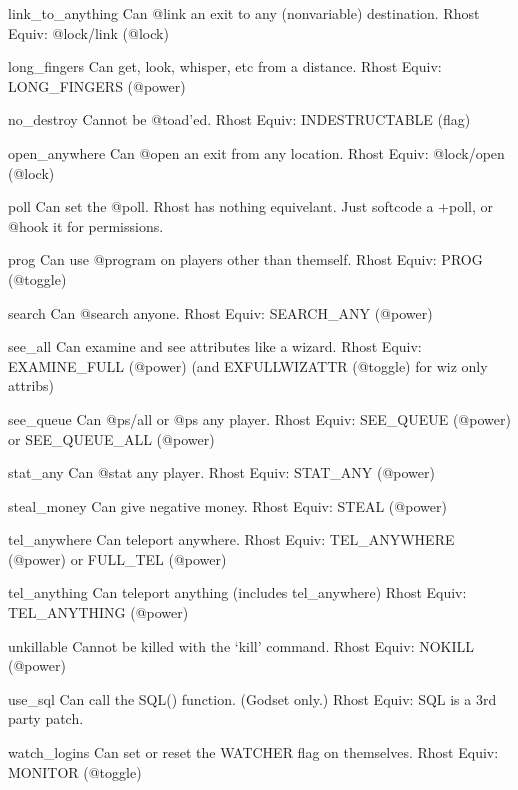 \documentclass[letterpaper,10pt,english]{sphinxmanual}
\begin{document}
\sphinxAtStartPar
link\_to\_anything      Can @link an exit to any (non\sphinxhyphen{}variable) destination.
Rhost Equiv: @lock/link (@lock)

\sphinxAtStartPar
long\_fingers          Can get, look, whisper, etc from a distance.
Rhost Equiv: LONG\_FINGERS (@power)

\sphinxAtStartPar
no\_destroy            Cannot be @toad’ed.
Rhost Equiv: INDESTRUCTABLE (flag)

\sphinxAtStartPar
open\_anywhere         Can @open an exit from any location.
Rhost Equiv: @lock/open (@lock)

\sphinxAtStartPar
poll                  Can set the @poll.
Rhost has nothing equivelant.  Just softcode a +poll, or @hook it for permissions.

\sphinxAtStartPar
prog                  Can use @program on players other than themself.
Rhost Equiv: PROG (@toggle)

\sphinxAtStartPar
search                Can @search anyone.
Rhost Equiv: SEARCH\_ANY (@power)

\sphinxAtStartPar
see\_all               Can examine and see attributes like a wizard.
Rhost Equiv: EXAMINE\_FULL (@power) (and EXFULLWIZATTR (@toggle) for wiz only attribs)

\sphinxAtStartPar
see\_queue             Can @ps/all or @ps any player.
Rhost Equiv: SEE\_QUEUE (@power) or SEE\_QUEUE\_ALL (@power)

\sphinxAtStartPar
stat\_any              Can @stat any player.
Rhost Equiv: STAT\_ANY (@power)

\sphinxAtStartPar
steal\_money           Can give negative money.
Rhost Equiv: STEAL (@power)

\sphinxAtStartPar
tel\_anywhere          Can teleport anywhere.
Rhost Equiv: TEL\_ANYWHERE (@power) or FULL\_TEL (@power)

\sphinxAtStartPar
tel\_anything          Can teleport anything (includes tel\_anywhere)
Rhost Equiv: TEL\_ANYTHING (@power)

\sphinxAtStartPar
unkillable            Cannot be killed with the ‘kill’ command.
Rhost Equiv: NOKILL (@power)

\sphinxAtStartPar
use\_sql               Can call the SQL() function. (God\sphinxhyphen{}set only.)
Rhost Equiv: SQL is a 3rd party patch.

\sphinxAtStartPar
watch\_logins          Can set or reset the WATCHER flag on themselves.
Rhost Equiv: MONITOR (@toggle)
\end{document}

